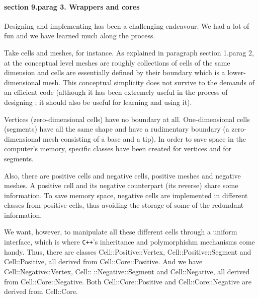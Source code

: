 \paragraph{\numb section 9.\numb parag 3. Wrappers and cores}

Designing and implementing {\maniFEM} has been a challenging endeavour.
We had a lot of fun and we have learned much along the process.

Take cells and meshes, for instance.
As explained in paragraph \numb section 1.\numb parag 2, at the conceptual level meshes
are roughly collections of cells of the same dimension and cells are essentially
defined by their boundary which is a lower-dimensional mesh.
This conceptual simplicity does not survive to the demands of an efficient code
(although it has been extremely useful in the process of designing \maniFEM;
it should also be useful for learning and using it).

Vertices (zero-dimensional cells) have no boundary at all.
One-dimensional cells (segments) have all the same shape and have a rudimentary boundary
(a zero-dimensional mesh consisting of a {\codett base} and a {\codett tip}).
In order to save space in the computer's memory, specific classes have been created for
vertices and for segments.

Also, there are positive cells and negative cells, positive meshes and negative meshes.
A positive cell and its negative counterpart (its {\codett reverse}) share some information.
To save memory space, negative cells are implemented in different classes from
positive cells, thus avoiding the storage of some of the redundant information.

We want, however, to manipulate all these different cells through a uniform interface,
which is where {\tt C++}'s inheritance and polymorphishm mechanisms come handy.
Thus, there are classes {\codett Cell::Positive::Vertex}, {\codett Cell::Positive::Segment}
and {\codett Cell::Positive}, all derived from {\codett Cell::Core::Positive}.
And we have {\codett Cell::Negative::Vertex}, {\codett Cell:: ::Negative::Segment} and {\codett
Cell::Negative}, all derived from {\codett Cell::Core::Negative}.
Both {\codett Cell::Core::Positive} and {\codett Cell::Core::Negative} are derived from
{\codett Cell::Core}.

